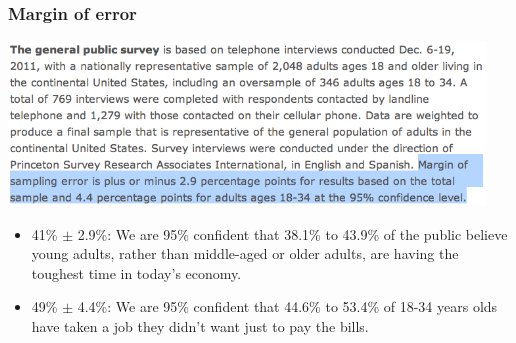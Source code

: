\begin{frame}
\frametitle{Margin of error}

\begin{center}
\includegraphics[width=0.95\textwidth]{4-1_var_in_est/figures/pew/pew4}
\end{center}

\begin{itemize}

\item 41\% $\pm$ 2.9\%: We are 95\% confident that 38.1\% to 43.9\% of the public believe young adults, rather than middle-aged or older adults, are having the toughest time in today's economy.


\item 49\% $\pm$ 4.4\%: We are 95\% confident that 44.6\% to 53.4\% of 18-34 years olds have taken a job they didn't want just to pay the bills.

\end{itemize}

\end{frame}


